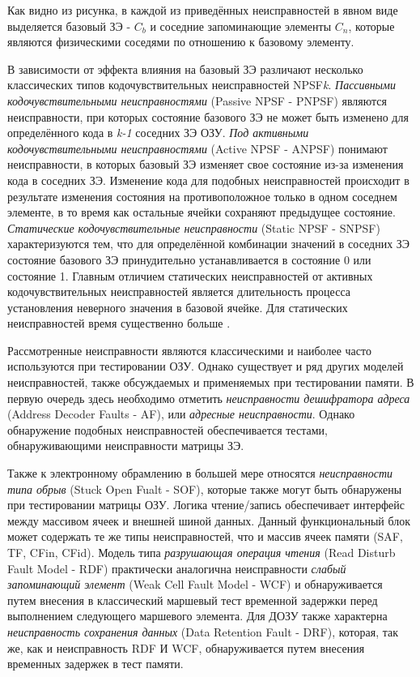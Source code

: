 Как видно из рисунка, в каждой из приведённых неисправностей в явном виде выделяется базовый ЗЭ - $C_b$ и соседние запоминающие элементы $C_n$, которые являются физическими соседями по отношению к базовому элементу.

В зависимости от эффекта влияния на базовый ЗЭ различают несколько классических типов кодочувствительных неисправностей NPSF\textit{k}.
\textit{Пассивными кодочувствительными неисправностями} (Passive NPSF - PNPSF) являются неисправности, при которых состояние базового ЗЭ не может быть изменено для определённого кода в \textit{k-1} соседних ЗЭ ОЗУ. 
\textit{Под активными кодочувствительными неисправностями} (Active NPSF - ANPSF) понимают неисправности, в которых базовый ЗЭ изменяет свое состояние из-за изменения кода в соседних ЗЭ. Изменение кода для подобных неисправностей происходит в результате изменения состояния на противоположное только в одном соседнем элементе, в то время как остальные ячейки сохраняют предыдущее состояние.
\textit{Статические кодочувствительные неисправности} (Static NPSF - SNPSF) характеризуются тем, что для определённой комбинации значений в соседних ЗЭ состояние базового ЗЭ принудительно устанавливается в состояние 0 или состояние 1. Главным отличием статических неисправностей от активных кодочувствительных неисправностей является длительность процесса установления неверного значения в базовой ячейке. Для статических неисправностей время существенно больше \cite{faults}.

Рассмотренные неисправности являются классическими и наиболее часто используются при тестировании ОЗУ. Однако существует и ряд других моделей неисправностей, также обсуждаемых и применяемых при тестировании памяти. В первую очередь здесь необходимо отметить \textit{неисправности дешифратора адреса} (Address Decoder Faults - AF), или \textit{адресные неисправности}. Однако обнаружение подобных неисправностей обеспечивается тестами, обнаруживающими неисправности матрицы ЗЭ.

Также к электронному обрамлению в большей мере относятся \textit{неисправности типа обрыв} (Stuck Open Fualt - SOF), которые также могут быть обнаружены при тестировании матрицы ОЗУ.
Логика чтение/запись обеспечивает интерфейс между массивом ячеек и внешней шиной данных. Данный функциональный блок может содержать те же типы неисправностей, что и массив ячеек памяти (SAF, TF, CFin, CFid). 
Модель типа \textit{разрушающая операция чтения} (Read Disturb Fault Model - RDF) практически аналогична неисправности \textit{слабый запоминающий элемент} (Weak Cell Fault Model - WCF) и обнаруживается путем внесения в классический маршевый тест временной задержки перед выполнением следующего маршевого элемента. Для ДОЗУ также характерна \textit{неисправность сохранения данных} (Data Retention Fault - DRF), которая, так же, как и неисправность RDF И WCF, обнаруживается путем внесения временных задержек в тест памяти.  

